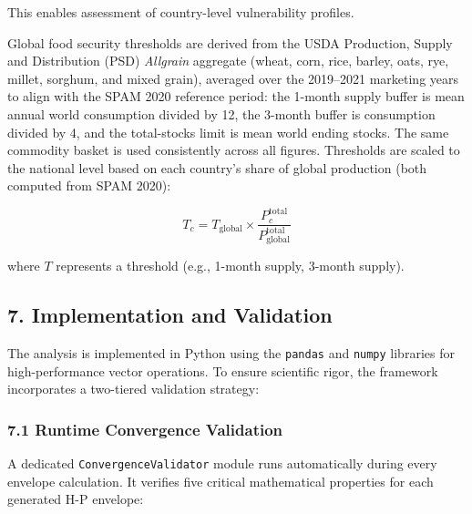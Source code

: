 \documentclass[11pt]{article}
\begin{document}
This enables assessment of country-level vulnerability profiles.

Global food security thresholds are derived from the USDA Production, Supply and Distribution (PSD) \emph{Allgrain} aggregate (wheat, corn, rice, barley, oats, rye, millet, sorghum, and mixed grain), averaged over the 2019--2021 marketing years to align with the SPAM 2020 reference period: the 1-month supply buffer is mean annual world consumption divided by 12, the 3-month buffer is consumption divided by 4, and the total-stocks limit is mean world ending stocks. The same commodity basket is used consistently across all figures. Thresholds are scaled to the national level based on each country's share of global production (both computed from SPAM 2020):

\begin{equation}
T_c = T_{\text{global}} \times \frac{P_c^{\text{total}}}{P_{\text{global}}^{\text{total}}}
\label{eq:threshold_scaling}
\end{equation}

where $T$ represents a threshold (e.g., 1-month supply, 3-month supply).

\subsection*{7. Implementation and Validation}

The analysis is implemented in Python using the \texttt{pandas} and \texttt{numpy} libraries for high-performance vector operations. To ensure scientific rigor, the framework incorporates a two-tiered validation strategy:

\subsubsection*{7.1 Runtime Convergence Validation}

A dedicated \texttt{ConvergenceValidator} module runs automatically during every envelope calculation. It verifies five critical mathematical properties for each generated H-P envelope:
\end{document}
